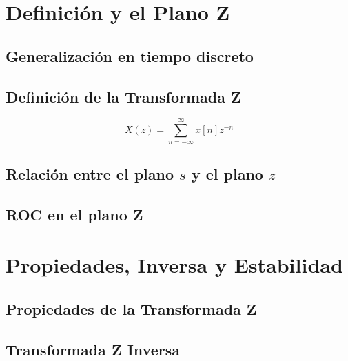 \documentclass[11pt,a4paper,openany]{book}
\begin{document}

\chapter{Definición y el Plano Z}

\section{Generalización en tiempo discreto}

\section{Definición de la Transformada Z}
\begin{equation}
	X(z) = \sum_{n=-\infty}^{\infty} x[n] z^{-n}
\end{equation}

\section{Relación entre el plano $s$ y el plano $z$}

\section{ROC en el plano Z}

\chapter{Propiedades, Inversa y Estabilidad}

\section{Propiedades de la Transformada Z}

\section{Transformada Z Inversa}
\end{document}
